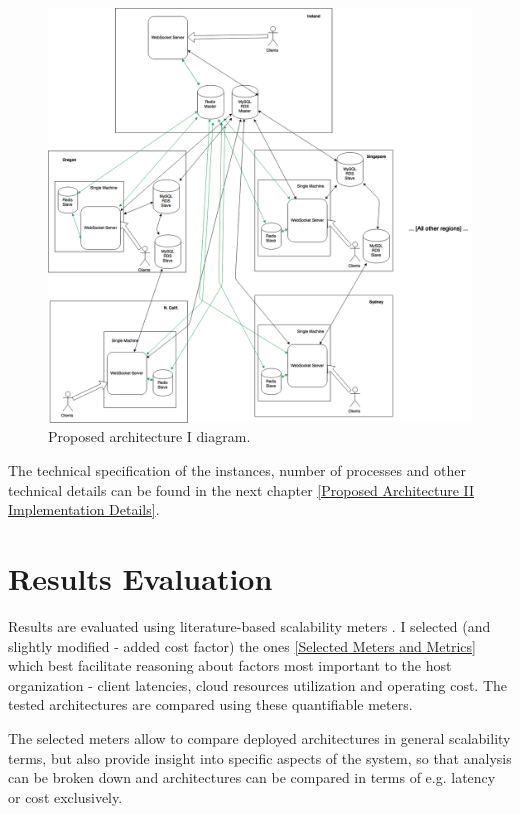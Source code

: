 \documentclass{uvamscse}
\begin{document}
\begin{figure}[H]
\centering
\includegraphics[scale=0.3]{archprop2}
\caption{Proposed architecture I diagram.}
\label{figure:archprop2}
\end{figure}

The technical specification of the instances, number of processes and other technical details can be found in the next chapter \ref{Proposed Architecture II Implementation Details}.

\section{Results Evaluation}
Results are evaluated using literature-based scalability meters \cite{Models}. I selected (and slightly modified - added cost factor) the ones \ref{Selected Meters and Metrics} which best facilitate reasoning about factors most important to the host organization - client latencies, cloud resources utilization and operating cost. The tested architectures are compared using these quantifiable meters.

The selected meters allow to compare deployed architectures in general scalability terms, but also provide insight into specific aspects of the system, so that analysis can be broken down and architectures can be compared in terms of e.g. latency or cost exclusively.
\end{document}
